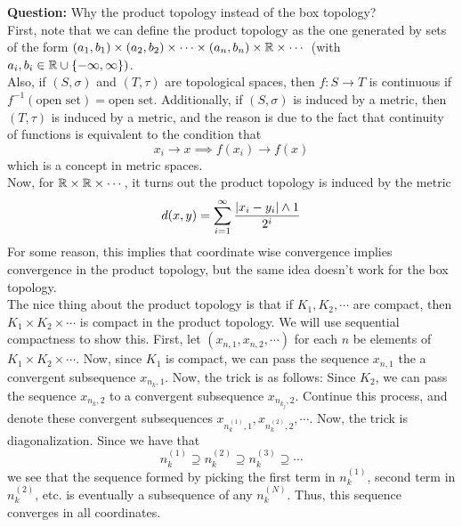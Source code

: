 
\textbf{Question:} Why the product topology instead of the box topology?\\

First, note that we can define the product topology as the one generated by sets of the form $(a_1, b_1) \times (a_2, b_2) \times \cdots \times (a_n, b_n) \times \mathbb{R} \times \cdots$ (with $a_i, b_i \in \mathbb{R} \cup \{-\infty, \infty\})$.\\

Also, if $(S, \sigma)$ and $(T, \tau)$ are topological spaces, then $f : S \to T$ is continuous if $f^{-1}(\text{open set}) = \text{open set}$. Additionally, if $(S, \sigma)$ is induced by a metric, then $(T, \tau)$ is induced by a metric, and the reason is due to the fact that continuity of functions is equivalent to the condition that
\[ x_i \to x \implies f(x_i) \to f(x) \]
which is a concept in metric spaces.\\

Now, for $\mathbb{R} \times \mathbb{R} \times \cdots$, it turns out the product topology is induced by the metric
\[ d(x, y) = \sum_{i = 1}^{\infty} \frac{\left\lvert {x_i - y_i} \right\rvert \wedge 1}{2^{i}} \]
For some reason, this implies that coordinate wise convergence implies convergence in the product topology, but the same idea doesn't work for the box topology. \\


The nice thing about the product topology is that if $K_1, K_2, \cdots$ are compact, then $K_1 \times K_2 \times \cdots$ is compact in the product topology. We will use sequential compactness to show this. First, let $(x_{n, 1}, x_{n, 2}, \cdots)$ for each $n$ be elements of $K_1 \times K_2 \times \cdots$. Now, since $K_1$ is compact, we can pass the sequence $x_{n, 1}$ the a convergent subsequence $x_{n_{k}, 1}$. Now, the trick is as follows: Since $K_2$, we can pass the sequence $x_{n_{k}, 2}$ to a convergent subsequence $x_{n_{k_j}, 2}$. Continue this process, and denote these convergent subsequences $x_{n_k^{(1)}, 1}, x_{n_k^{(2)}, 2}, \cdots$. Now, the trick is diagonalization. Since we have that
\[ n_{k}^{(1)} \supseteq n_{k}^{(2)} \supseteq n_{k}^{(3)} \supseteq \cdots \]
we see that the sequence formed by picking the first term in $n_{k}^{(1)}$, second term in $n_{k}^{(2)}$, etc. is eventually a subsequence of any $n_{k}^{(N)}$. Thus, this sequence converges in all coordinates.